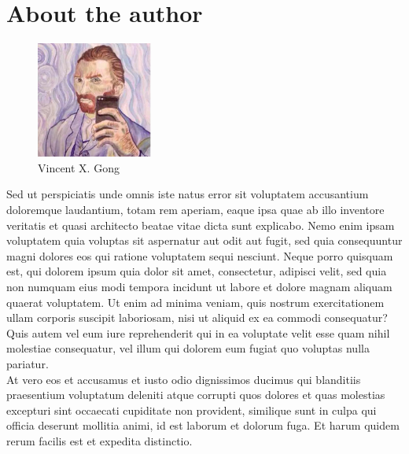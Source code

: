 \chapter*{About the author}


\graphicspath{{./ch-x-others/images/}}

\begin{figure}
\includegraphics[width=0.34\textwidth, trim=0 0 0 0.8cm]{vincent.jpg}\par
\caption{\label{fig:frog2}Vincent X. Gong}
\end{figure}

Sed ut perspiciatis unde omnis iste natus error sit voluptatem accusantium doloremque laudantium, totam rem aperiam, eaque ipsa quae ab illo inventore veritatis et quasi architecto beatae vitae dicta sunt explicabo. Nemo enim ipsam voluptatem quia voluptas sit aspernatur aut odit aut fugit, sed quia consequuntur magni dolores eos qui ratione voluptatem sequi nesciunt. Neque porro quisquam est, qui dolorem ipsum quia dolor sit amet, consectetur, adipisci velit, sed quia non numquam eius modi tempora incidunt ut labore et dolore magnam aliquam quaerat voluptatem. Ut enim ad minima veniam, quis nostrum exercitationem ullam corporis suscipit laboriosam, nisi ut aliquid ex ea commodi consequatur? Quis autem vel eum iure reprehenderit qui in ea voluptate velit esse quam nihil molestiae consequatur, vel illum qui dolorem eum fugiat quo voluptas nulla pariatur.\\

At vero eos et accusamus et iusto odio dignissimos ducimus qui blanditiis praesentium voluptatum deleniti atque corrupti quos dolores et quas molestias excepturi sint occaecati cupiditate non provident, similique sunt in culpa qui officia deserunt mollitia animi, id est laborum et dolorum fuga. Et harum quidem rerum facilis est et expedita distinctio.\\


